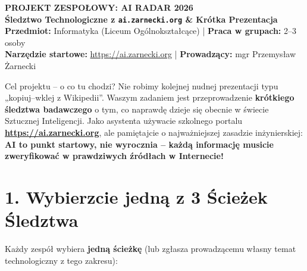 \documentclass[11pt,a4paper]{article}
\begin{document}
\begin{center}
    {\LARGE\textbf{PROJEKT ZESPOŁOWY: AI RADAR 2026}}\\[5pt]
    {\large\textbf{Śledztwo Technologiczne z \texttt{ai.zarnecki.org} \& Krótka Prezentacja}}\\[6pt]
    \textbf{Przedmiot:} Informatyka (Liceum Ogólnokształcące) \quad | \quad \textbf{Praca w grupach:} 2--3 osoby\\[2pt]
    \textbf{Narzędzie startowe:} \url{https://ai.zarnecki.org} \quad | \quad \textbf{Prowadzący:} mgr Przemysław Żarnecki
\end{center}

\vspace{0.2cm}

\begin{infobox}{Cel projektu -- o co tu chodzi?}
Nie robimy kolejnej nudnej prezentacji typu „kopiuj--wklej z Wikipedii”. Waszym zadaniem jest przeprowadzenie \textbf{krótkiego śledztwa badawczego} o tym, co naprawdę dzieje się obecnie w świecie Sztucznej Inteligencji. Jako asystenta używacie szkolnego portalu \textbf{\url{https://ai.zarnecki.org}}, ale pamiętajcie o najważniejszej zasadzie inżynierskiej: \textbf{AI to punkt startowy, nie wyrocznia -- każdą informację musicie zweryfikować w prawdziwych źródłach w Internecie!}
\end{infobox}

\section{1. Wybierzcie jedną z 3 Ścieżek Śledztwa}

Każdy zespół wybiera \textbf{jedną ścieżkę} (lub zgłasza prowadzącemu własny temat technologiczny z tego zakresu):
\end{document}
